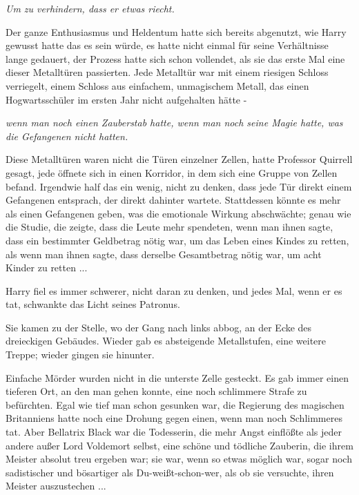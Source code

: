 \emph{Um zu verhindern, dass er etwas riecht.}

Der ganze Enthusiasmus und Heldentum hatte sich bereits abgenutzt, wie Harry
gewusst hatte das es sein würde, es hatte nicht einmal für seine Verhältnisse
lange gedauert, der Prozess hatte sich schon vollendet, als sie das erste Mal
eine dieser Metalltüren passierten. Jede Metalltür war mit einem riesigen
Schloss verriegelt, einem Schloss aus einfachem, unmagischem Metall, das einen
Hogwartsschüler im ersten Jahr nicht aufgehalten hätte -

\emph{wenn man noch einen Zauberstab hatte, wenn man noch seine Magie hatte,
was die Gefangenen nicht hatten.}

Diese Metalltüren waren nicht die Türen einzelner Zellen, hatte Professor
Quirrell gesagt, jede öffnete sich in einen Korridor, in dem sich eine Gruppe
von Zellen befand. Irgendwie half das ein wenig, nicht zu denken, dass jede Tür
direkt einem Gefangenen entsprach, der direkt dahinter wartete. Stattdessen
könnte es mehr als einen Gefangenen geben, was die emotionale Wirkung
abschwächte; genau wie die Studie, die zeigte, dass die Leute mehr spendeten,
wenn man ihnen sagte, dass ein bestimmter Geldbetrag nötig war, um das Leben
eines Kindes zu retten, als wenn man ihnen sagte, dass derselbe Gesamtbetrag
nötig war, um acht Kinder zu retten ...

Harry fiel es immer schwerer, nicht daran zu denken, und jedes Mal, wenn er
es tat, schwankte das Licht seines Patronus.

Sie kamen zu der Stelle, wo der Gang nach links abbog, an der Ecke des
dreieckigen Gebäudes. Wieder gab es absteigende Metallstufen, eine weitere
Treppe; wieder gingen sie hinunter.

Einfache Mörder wurden nicht in die unterste Zelle gesteckt. Es gab immer einen
tieferen Ort, an den man gehen konnte, eine noch schlimmere Strafe zu
befürchten. Egal wie tief man schon gesunken war, die Regierung des magischen
Britanniens hatte noch eine Drohung gegen einen, wenn man noch Schlimmeres tat.
Aber Bellatrix Black war die Todesserin, die mehr Angst einflößte als jeder
andere außer Lord Voldemort selbst, eine schöne und tödliche Zauberin, die ihrem
Meister absolut treu ergeben war; sie war, wenn so etwas möglich war, sogar noch
sadistischer und bösartiger als Du-weißt-schon-wer, als ob sie versuchte, ihren
Meister auszustechen ...

